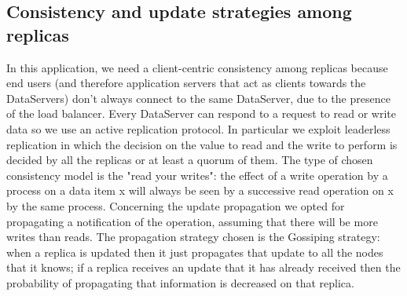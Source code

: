 \documentclass[a4paper]{report}
\begin{document}
\subsection{Consistency and update strategies among replicas}
In this application,  we need a client-centric consistency among replicas because end users (and therefore application servers that act as clients towards the DataServers) don't always connect to the same DataServer, due to the presence of the load balancer. Every DataServer can respond to a request to read or write data so we use an active replication protocol. In particular we exploit leaderless replication in which the decision on the value to read and the write to perform is decided by all the replicas or at least a quorum of them. The type of chosen consistency model  is the "read your writes": the effect of a write operation by a process on a data item x will always be seen by a successive read operation on x by the same process. 
Concerning the update propagation we opted for propagating a notification of the operation, assuming that there will be more writes than reads.  The propagation strategy chosen is the Gossiping strategy: when a replica is updated then it just propagates that update to all the nodes that it knows; if a replica receives an update that it has already received then the probability of propagating that information is decreased on that replica. 
\end{document}
